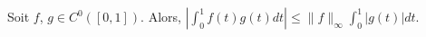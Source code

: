 Soit $f$, $g\in C^0([0,1])$. Alors, $\left|\int_0^1f(t)g(t)dt\right|\leq \|f\|_\infty \int_0^1 \left\lvert g(t) \right\rvert dt$.

\begin{reponses}
\end{reponses}

